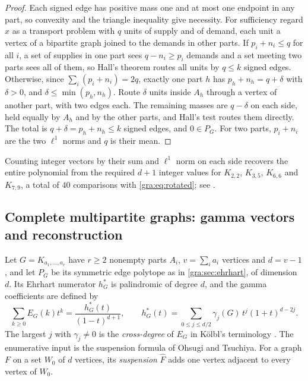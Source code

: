 \begin{proof}
Each signed edge has positive mass one and at most one endpoint in any
part, so convexity and the triangle inequality give necessity. For
sufficiency regard $x$ as a transport problem with $q$ units of supply
and of demand, each unit a vertex of a bipartite graph joined to the
demands in other parts. If $p_i+n_i\le q$ for all $i$, a set of supplies
in one part sees $q-n_i\ge p_i$ demands and a set meeting two parts sees
all of them, so Hall's theorem routes all units by $q\le k$ signed edges.
Otherwise, since $\sum_i(p_i+n_i)=2q$, exactly one part $h$ has
$p_h+n_h=q+\delta$ with $\delta>0$, and $\delta\le\min(p_h,n_h)$. Route
$\delta$ units inside $A_h$ through a vertex of another part, with two
edges each. The remaining masses are $q-\delta$ on each side, held
equally by $A_h$ and by the other parts, and Hall's test routes them
directly. The total is $q+\delta=p_h+n_h\le k$ signed edges, and $0\in
P_G$. For two parts, $p_i+n_i$ are the two $\ell^1$ norms and $q$ is their
mean.
\end{proof}

Counting integer vectors by their sum and $\ell^1$ norm on each side
recovers the entire polynomial from the required $d+1$ integer values for
$K_{2,2}$, $K_{3,5}$, $K_{6,6}$ and $K_{7,9}$, a total of $40$ comparisons
with \eqref{gra:eq:rotated}; see
.

\subsection{Complete multipartite graphs: gamma vectors and reconstruction}\label{grw:sec:multipartite}

Let $G=K_{a_1,\dots,a_r}$ have $r\ge2$ nonempty parts $A_i$, $v=\sum_ia_i$
vertices and $d=v-1$, and let $P_G$ be its symmetric edge polytope as in
\cref{gra:sec:ehrhart}, of dimension $d$. Its Ehrhart numerator $h^*_G$ is
palindromic of degree $d$, and the gamma coefficients are defined by
\[
 \sum_{k\ge0}E_G(k)t^k=\frac{h^*_G(t)}{(1-t)^{d+1}},\qquad
 h^*_G(t)=\sum_{0\le j\le d/2}\gamma_j(G)\,t^j(1+t)^{d-2j}.
\]
The largest $j$ with $\gamma_j\ne0$ is the \emph{cross-degree} of $E_G$ in
K\"olbl's terminology \cite[Proposition~4.3]{Kolbl2024Ehrhart}. The
enumerative input is the suspension formula of Ohsugi and Tsuchiya. For a
graph $F$ on a set $W_0$ of $d$ vertices, its \emph{suspension}
$\widehat F$ adds one vertex adjacent to every vertex of $W_0$.

